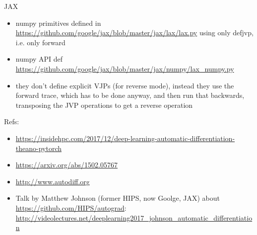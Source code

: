 \documentclass[paper=a4,11pt,headsepline]{scrartcl}
\begin{document}
JAX

\begin{itemize}
    \item numpy primitives defined in
        \url{https://github.com/google/jax/blob/master/jax/lax/lax.py} using
        only defjvp, i.e. only forward
    \item numpy API def
        \url{https://github.com/google/jax/blob/master/jax/numpy/lax_numpy.py}
    \item they don't define explicit VJPs (for reverse mode), instead they use
        the forward trace, which has to be done anyway, and then run that
        backwards, transposing the JVP operations to get a reverse operation
\end{itemize}

Refs:

\begin{itemize}
    \item \url{https://insidehpc.com/2017/12/deep-learning-automatic-differentiation-theano-pytorch}
    \item \url{https://arxiv.org/abs/1502.05767}
    \item \url{http://www.autodiff.org}
    \item Talk by Matthew Johnson (former HIPS, now Goolge, JAX) about
        \url{https://github.com/HIPS/autograd}:
        \url{http://videolectures.net/deeplearning2017_johnson_automatic_differentiation}
\end{itemize}
\end{document}
